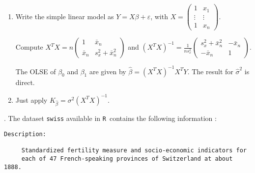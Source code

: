 \documentclass[12pt]{article}
\newcommand \noi \noindent
\newcommand{\dsp}{\displaystyle}
\newcommand{\R}{\texttt{R}}
\begin{document}
\begin{enumerate}

\item
Write the simple linear model as $Y=X \beta + \varepsilon$, with 
$X = \left(
                   \begin{array}{cc}
                       1       & x_1    \\
                       \vdots  & \vdots    \\
                       1       & x_n
                   \end{array}
                   \right)$.

Compute $X^TX = n \left(
                   \begin{array}{cc}
                       1       & \bar{x}_n    \\
                       \bar{x}_n       & s_x^2 + \bar{x}_n^2
                   \end{array}
                   \right)$
and $(X^TX)^{-1} = {\dsp \frac{1}{ns_x^2}} \left(
                   \begin{array}{cc}
                       s_x^2 + \bar{x}_n^2       & -\bar{x}_n    \\
                       -\bar{x}_n       & 1
                   \end{array}
                   \right)$.
									
The OLSE of $\beta_0$ and $\beta_1$ are given by $\hat{\beta} = (X^TX)^{-1} X^T Y$. The result for $\widehat{\sigma}^2$ is direct.

\item Just apply $K_{\hat{\beta}} = \sigma^2 (X^TX)^{-1}$.

\end{enumerate}



\vspace{5mm}


\noi{\bf Exercice 2}. The dataset  \texttt{swiss} available in \R\ contains the following information :
\begin{verbatim}
Description:

     Standardized fertility measure and socio-economic indicators for
     each of 47 French-speaking provinces of Switzerland at about 1888.
\end{verbatim}
\end{document}
